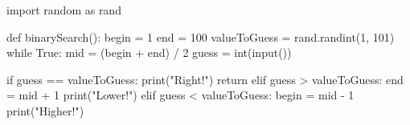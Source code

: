 \documentclass[main.tex]{subfiles}
\begin{document}
\begin{python}
    import random as rand

    def binarySearch():
        begin = 1
        end = 100
        valueToGuess = rand.randint(1, 101)
        while True:
            mid = (begin + end) / 2
            guess = int(input())

            if guess == valueToGuess:
                print("Right!")
                return
            elif guess > valueToGuess:
                end = mid + 1
                print("Lower!")
            elif guess < valueToGuess:
                begin = mid - 1
                print("Higher!")                

\end{python}

\end{document}
